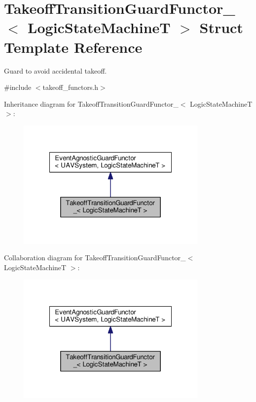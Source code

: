 \hypertarget{structTakeoffTransitionGuardFunctor__}{\section{Takeoff\-Transition\-Guard\-Functor\-\_\-$<$ Logic\-State\-Machine\-T $>$ Struct Template Reference}
\label{structTakeoffTransitionGuardFunctor__}
}


Guard to avoid accidental takeoff.  




{\ttfamily \#include $<$takeoff\-\_\-functors.\-h$>$}



Inheritance diagram for Takeoff\-Transition\-Guard\-Functor\-\_\-$<$ Logic\-State\-Machine\-T $>$\-:\nopagebreak
\begin{figure}[H]
\begin{center}
\leavevmode
\includegraphics[width=264pt]{structTakeoffTransitionGuardFunctor____inherit__graph}
\end{center}
\end{figure}


Collaboration diagram for Takeoff\-Transition\-Guard\-Functor\-\_\-$<$ Logic\-State\-Machine\-T $>$\-:\nopagebreak
\begin{figure}[H]
\begin{center}
\leavevmode
\includegraphics[width=264pt]{structTakeoffTransitionGuardFunctor____coll__graph}
\end{center}
\end{figure}
